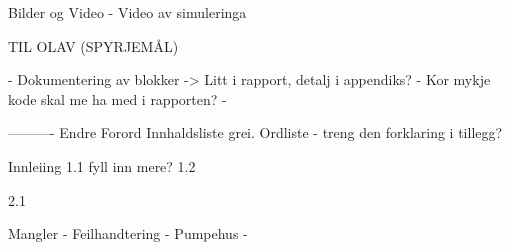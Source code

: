 Bilder og Video
- Video av simuleringa



TIL OLAV (SPYRJEMÅL)

- Dokumentering av blokker -> Litt i rapport, detalj i appendiks?
- Kor mykje kode skal me ha med i rapporten?
- 



----------
Endre Forord
Innhaldsliste grei.
Ordliste - treng den forklaring i tillegg?

Innleiing
1.1 fyll inn mere?
1.2

2.1

Mangler
- Feilhandtering
- Pumpehus
- 
